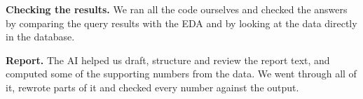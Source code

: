 \documentclass[12pt,a4paper]{article}
\begin{document}
\textbf{Checking the results.} We ran all the code ourselves and checked the
answers by comparing the query results with the EDA and by looking at the
data directly in the database.

\textbf{Report.} The AI helped us draft, structure and review the report
text, and computed some of the supporting numbers from the data. We went
through all of it, rewrote parts of it and checked every number against the
output.
\end{document}
